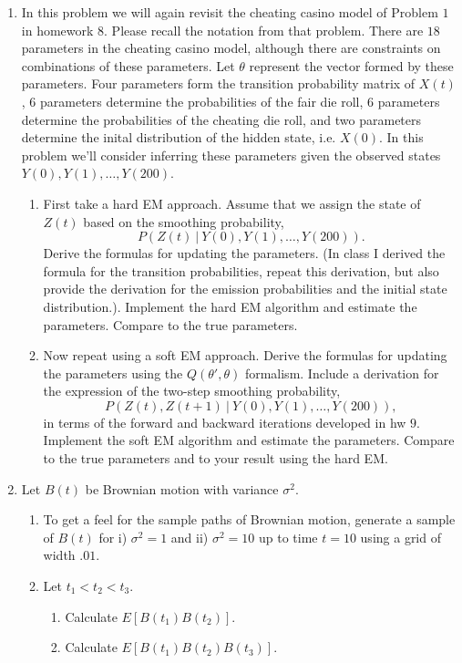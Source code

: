 \documentclass{article}
\begin{document}
\begin{enumerate} 

\item  In this problem we will again revisit the cheating casino model of Problem $1$ in homework $8$.  Please recall the notation from that problem.  There are $18$ parameters in the cheating casino model, although there are constraints on combinations of these parameters.  Let $\theta$ represent the vector formed by these parameters.  Four parameters form the transition probability matrix of $X(t)$, $6$ parameters determine the probabilities of the fair die roll,  $6$ parameters determine the probabilities of the cheating die roll, and two parameters determine the inital distribution of the hidden state, i.e. $X(0)$.   In this problem we'll consider inferring these parameters given the observed states $Y(0), Y(1), \dots, Y(200)$.   
\begin{enumerate}
\item First take a hard EM approach.  Assume that we assign the state of $Z(t)$ based on the smoothing probability,
\begin{equation*}
P(Z(t) \ | \ Y(0), Y(1), \dots, Y(200)). 
\end{equation*}
Derive the formulas for updating the parameters.  (In class I derived the formula for the transition probabilities, repeat this derivation, but also provide the derivation for the emission probabilities and the initial state distribution.).  Implement the hard EM algorithm and estimate the parameters.  Compare to the true parameters.
\item Now repeat using a soft EM approach.  Derive the formulas for updating the parameters using the $Q(\theta', \theta)$ formalism.  Include a derivation for the expression of the two-step smoothing probability, 
\begin{equation*}
P(Z(t), Z(t+1) \ | \ Y(0), Y(1), \dots, Y(200)),
\end{equation*}
in terms of the forward and backward iterations developed in hw $9$.    Implement the soft EM algorithm and estimate the parameters.  Compare to the true parameters and to your result using the hard EM.
\end{enumerate}

\item Let $B(t)$ be Brownian motion with variance $\sigma^2$.
\begin{enumerate}
\item To get a feel for the sample paths of Brownian motion, generate a sample of $B(t)$ for i) $\sigma^2 = 1$ and ii) $\sigma^2=10$ up to time $t=10$ using a grid of width $.01$.  
\item Let $t_1 < t_2 < t_3$.  
\begin{enumerate}
\item Calculate $E[B(t_1)B(t_2)]$.
\item Calculate $E[B(t_1)B(t_2)B(t_3)]$.
\end{enumerate}
\end{enumerate}

\end{enumerate}
\end{document}
